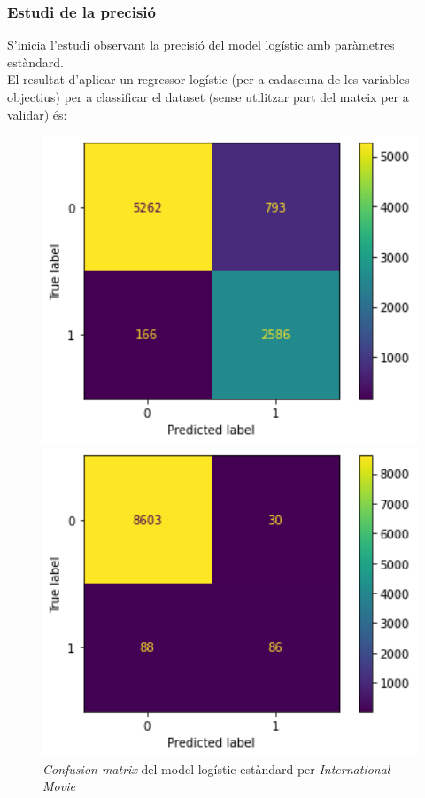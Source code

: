 \documentclass[a4paper, 11pt]{article}
\begin{document}
\subsubsection{Estudi de la precisió}
S'inicia l'estudi observant la precisió del model logístic amb paràmetres estàndard.\\
El resultat d'aplicar un regressor logístic (per a cadascuna de les variables objectius) per a classificar el dataset (sense utilitzar part del mateix per a validar) és:
\begin{figure}[h] %
\begin{minipage}{5cm} %
\begin{center}
    \includegraphics[width=1\textwidth]{ConfMatrix/CM_log_internationalMovie.png}
    \caption{\textit{Confusion matrix} del model logístic estàndard per \textit{International Movie}}
    \includegraphics[width=1\textwidth]{ConfMatrix/CM_log_Spanish.png}

\end{center}
\end{minipage}
\end{figure}
\end{document}
